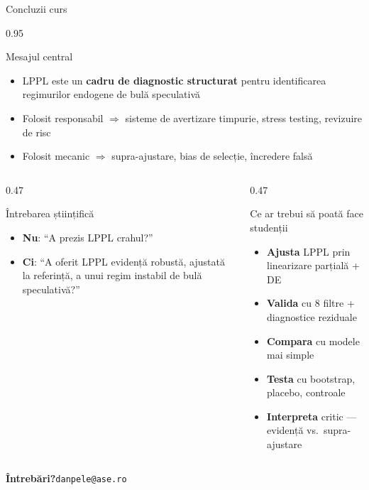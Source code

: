 \documentclass[9pt, aspectratio=169, t]{beamer}
\begin{document}
\begin{frame}{Concluzii curs}
    \begin{cminipage}{0.95\textwidth}
    {\scriptsize
    \begin{block}{Mesajul central}
        \begin{itemize}\setlength{\itemsep}{0pt}
            \item LPPL este un \textbf{cadru de diagnostic structurat} pentru identificarea regimurilor endogene de bulă speculativă
            \item Folosit responsabil $\Rightarrow$ sisteme de avertizare timpurie, stress testing, revizuire de risc
            \item Folosit mecanic $\Rightarrow$ supra-ajustare, bias de selecție, încredere falsă
        \end{itemize}
    \end{block}
    \vspace{-3mm}
    \begin{columns}[T]
        \begin{column}{0.47\textwidth}
            \begin{block}{Întrebarea științifică}
                \begin{itemize}\setlength{\itemsep}{0pt}
                    \item \textbf{Nu}: ``A prezis LPPL crahul?''
                    \item \textbf{Ci}: ``A oferit LPPL evidență robustă, ajustată la referință, a unui regim instabil de bulă speculativă?''
                \end{itemize}
            \end{block}
        \end{column}
        \begin{column}{0.47\textwidth}
            \begin{exampleblock}{Ce ar trebui să poată face studenții}
                \begin{itemize}\setlength{\itemsep}{0pt}
                    \item \textbf{Ajusta} LPPL prin linearizare parțială + DE
                    \item \textbf{Valida} cu 8 filtre + diagnostice reziduale
                    \item \textbf{Compara} cu modele mai simple
                    \item \textbf{Testa} cu bootstrap, placebo, controale
                    \item \textbf{Interpreta} critic --- evidență vs.\ supra-ajustare
                \end{itemize}
            \end{exampleblock}
        \end{column}
    \end{columns}
    \vspace{-1mm}
    \begin{center}
        {\Large\textbf{Întrebări?}}\quad\texttt{danpele@ase.ro}
    \end{center}
    }
    \end{cminipage}
\end{frame}
\end{document}
